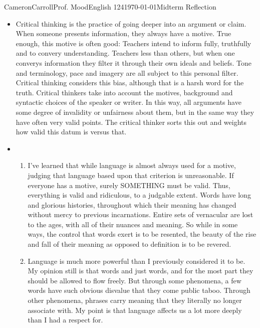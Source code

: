 \documentclass[12pt,letterpaper]{article}
\begin{document}
\begin{mla}{Cameron}{Carroll}{Prof. Mood}{English 124}{\today}{Midterm Reflection}
\singlespacing

\begin{itemize}

\item Critical thinking is the practice of going deeper into an argument or claim. When someone presents information, they always have a motive. True enough, this motive is often good: Teachers intend to inform fully, truthfully and to convery understanding. Teachers less than others, but when one converys information they filter it through their own ideals and beliefs. Tone and terminology, pace and imagery are all subject to this personal filter. Critical thinking considers this bias, although that is a harsh word for the truth. Critical thinkers take into account the motives, background and syntactic choices of the speaker or writer. In this way, all arguments have some degree of invalidity or unfairness about them, but in the same way they have often very valid points. The critical thinker sorts this out and weights how valid this datum is versus that. \\

\item \begin {enumerate}

 \item I've learned that while language is almost always used for a motive, judging that language based upon that criterion is unreasonable. If everyone has a motive, surely SOMETHING must be valid. Thus, everything is valid and ridiculous, to a judgable extent. Words have long and glorious histories, throughout which their meaning has changed without mercy to previous incarnations. Entire sets of vernacular are lost to the ages, with all of their nuances and meaning. So while in some ways, the control that words exert is to be resented, the beauty of the rise and fall of their meaning as opposed to definition is to be revered. \\

\item Language is much more powerful than I previously considered it to be. My opinion still is that words and just words, and for the most part they should be allowed to flow freely. But through some phenomena, a few words have such obvious disvalue that they come public taboo. Through other phenomena, phrases carry meaning that they literally no longer associate with. My point is that language affects us a lot more deeply than I had a respect for. \\


\end{enumerate}
\end{itemize}
\end{mla}
\end{document}
